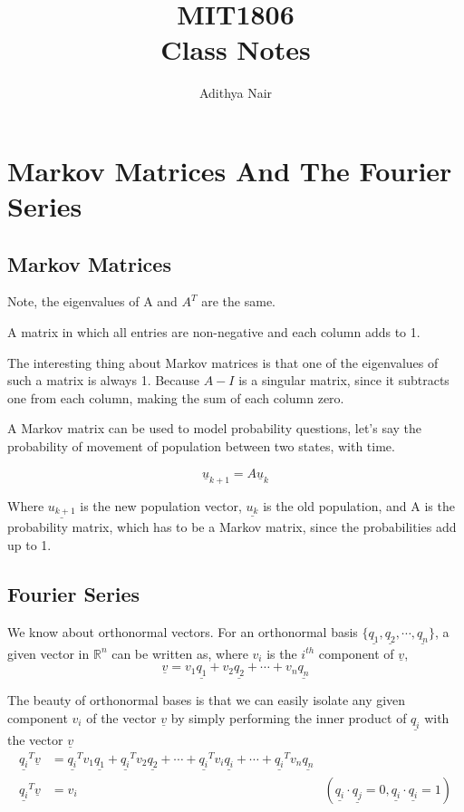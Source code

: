 \documentclass[twoside]{report}
\title{\Huge{MIT1806}\\ Class Notes}
\author{\huge{Adithya Nair}}
\date{}
\renewcommand{\vec}[1]{\underline{#1}}
\begin{document}
\maketitle
\newpage%
\tableofcontents

\chapter{Markov Matrices And The Fourier Series}

\section{Markov Matrices}
Note, the eigenvalues of A and $A^T$ are the same.
\begin{definition}
	A matrix in which all entries are non-negative and each column adds to 1.
\end{definition}

The interesting thing about Markov matrices is that one of the eigenvalues of such a matrix is always 1. Because $A - I$ is a singular matrix, since it subtracts one from each column, making the sum of each column zero. 

A Markov matrix can be used to model probability questions, let's say the probability of movement of population between two states, with time.

\[\vec{u}_{k+1} = A \vec{u}_k\]

Where $\vec{u_{k+1}}$ is the new population vector, $\vec{u_k}$ is the old population, and A is the probability matrix, which has to be a Markov matrix, since the probabilities add up to 1.
\section{Fourier Series}
We know about orthonormal vectors. For an orthonormal basis $\{\vec{q_1},\vec{q_2}, \cdots, \vec{q_n}\}$, a given vector in $\mathbb{R}^n$ can be written as, where $v_i$ is the $i^{th}$ component of $\vec{v}$,
\[
	\vec{v} = v_1 \vec{q_1} + v_2 \vec{q_2} + \cdots + v_n \vec{q_n}
\]

The beauty of orthonormal bases is that we can easily isolate any given component $v_i$ of the vector $\vec{v}$ by simply performing the inner product of $\vec{q_i}$ with the vector $\vec{v}$
\begin{align*}
	\vec{q_i}^T\vec{v} &= \vec{q_i}^T v_1 \vec{q_1} + \vec{q_i}^T v_2 \vec{q_2} + \cdots + \vec{q_i}^T v_i \vec{q_i} + \cdots + \vec{q_i}^T v_n \vec{q_n} \\
	\vec{q_i}^T \vec{v} &= v_i &(\vec{q_i}\cdot \vec{q_j} = 0, \vec{q_i} \cdot \vec{q_i} = 1)
\end{align*}
\end{document}
